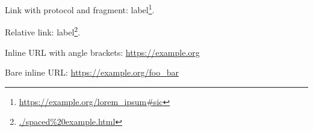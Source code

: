 Link with protocol and fragment: label\footnote{\url{https://example.org/lorem_ipsum\#sic}}.

Relative link: label\footnote{\url{./spaced\%20example.html}}.

Inline URL with angle brackets: \url{https://example.org}

Bare inline URL: \url{https://example.org/foo_bar}

